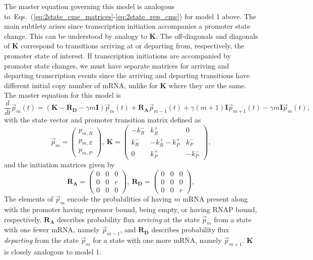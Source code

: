 \documentclass[12pt]{article}%
\newcommand{\vect}[1]{\vec{#1}}
\newcommand{\matr}[1]{\mathbf{#1}}
\newcommand{\deriv}[2][{}]{\frac{d #1}{d #2}}
\newcommand{\eqrange}[2]{Eqs.~(\ref{#1}-\ref{#2})}
\begin{document}
The master equation governing this model is analogous
to~\eqrange{eq:2state_cme_matrices}{eq:2state_rep_cme} for model 1 above.
The main subtlety arises since transcription initiation
accompanies a promoter state change.
This can be understood by analogy to $\matr{K}$. The
off-diagonals and diagonals of $\matr{K}$ correspond to
transitions arriving at or departing from, respectively, the
promoter state of interest. If transcription initiations are
accompanied by promoter state changes, we must have separate
matrices for arriving and departing transcription events since
the arriving and departing transitions have different initial
copy number of mRNA, unlike for $\matr{K}$ where they are the same.
The master equation for this model is
\begin{equation}
\deriv{t}\vect{p}_m(t) =
\left( \matr{K} - \matr{R_D} - \gamma m \matr{I} \right) \vect{p}_m(t)
                + \matr{R_A} \vect{p}_{m-1}(t) +
                \gamma (m+1) \matr{I} \vect{p}_{m+1}(t)
                - \gamma m \matr{I} \vect{p}_m(t),
\label{eq:3state_rep_cme}
\end{equation}
with the state vector and promoter transition matrix defined as
\begin{equation}
\vect{p}_m = \begin{pmatrix} p_{m,R} \\ p_{m,E} \\ p_{m,P} \end{pmatrix},\
\matr{K} = \begin{pmatrix} -k_R^- & k_R^+ & 0 \\
                        k_R^- & -k_R^+ -k_P^+ & k_P^- \\
                        0 & k_P^+ & -k_P^- 
                \end{pmatrix},
\label{eq:3state_cme_matrices_pt1}
\end{equation}
and the initiation matrices given by
\begin{equation}
\matr{R_A} = \begin{pmatrix}
                0 & 0 & 0 \\ 0 & 0 & r \\ 0 & 0 & 0
                \end{pmatrix},\
\matr{R_D} = \begin{pmatrix}
                0 & 0 & 0 \\ 0 & 0 & 0 \\ 0 & 0 & r
                \end{pmatrix},
\label{eq:3state_cme_matrices_pt2}
\end{equation}
The elements of $\vect{p}_m$ encode the probabilities of having
$m$ mRNA present along with the promoter having repressor bound,
being empty, or having RNAP bound, respectively.
$\matr{R_A}$ describes probability flux \textit{arriving} at the state
$\vect{p}_m$ from a state with one fewer mRNA, namely
$\vect{p}_{m-1}$, and $\matr{R_D}$ describes probability flux
\textit{departing} from the state $\vect{p}_m$
for a state with one more mRNA, namely $\vect{p}_{m+1}$.
$\matr{K}$ is closely analogous to model 1.
\end{document}
